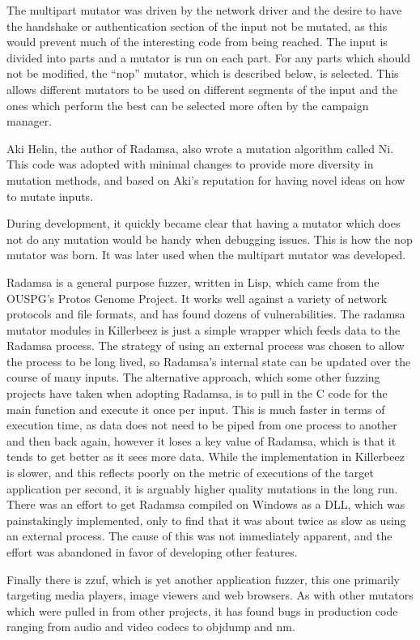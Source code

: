 The multipart mutator was driven by the network driver and the desire to have
the handshake or authentication section of the input not be mutated, as this
would prevent much of the interesting code from being reached.  The input is
divided into parts and a mutator is run on each part. For any parts which
should not be modified, the ``nop'' mutator, which is described below, is
selected. This allows different mutators to be used on different segments of
the input and the ones which perform the best can be selected more often by the
campaign manager.

Aki Helin, the author of Radamsa, also wrote a mutation algorithm called Ni.
This code was adopted with minimal changes to provide more diversity in
mutation methods, and based on Aki's reputation for having novel ideas on how
to mutate inputs.

During development, it quickly became clear that having a mutator which does
not do any mutation would be handy when debugging issues.  This is how the nop
mutator was born. It was later used when the multipart mutator was developed.

Radamsa is a general purpose fuzzer, written in Lisp, which came from the
OUSPG's Protos Genome Project. It works well against a variety of network
protocols and file formats, and has found dozens of vulnerabilities.  The
radamsa mutator modules in Killerbeez is just a simple wrapper which feeds data
to the Radamsa process.  The strategy of using an external process was chosen
to allow the process to be long lived, so Radamsa's internal state can be
updated over the course of many inputs.  The alternative approach, which some
other fuzzing projects have taken when adopting Radamsa, is to pull in the C
code for the main function and execute it once per input.  This is much faster
in terms of execution time, as data does not need to be piped from one process
to another and then back again, however it loses a key value of Radamsa, which
is that it tends to get better as it sees more data. While the implementation
in Killerbeez is slower, and this reflects poorly on the metric of executions
of the target application per second, it is arguably higher quality mutations
in the long run.  There was an effort to get Radamsa compiled on Windows as a
DLL, which was painstakingly implemented, only to find that it was about twice
as slow as using an external process. The cause of this was not immediately
apparent, and the effort was abandoned in favor of developing other features.

Finally there is zzuf, which is yet another application fuzzer, this one
primarily targeting media players, image viewers and web browsers.  As with
other mutators which were pulled in from other projects, it has found bugs in
production code ranging from audio and video codecs to objdump and nm.

